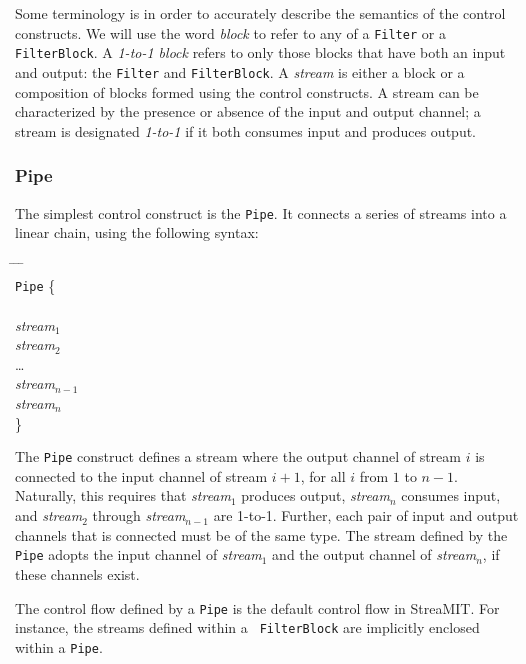 \documentclass[draft]{article}
\begin{document}
Some terminology is in order to accurately describe the semantics of
the control constructs.  We will use the word {\it block} to refer to
any of a {\tt Filter} or a {\tt FilterBlock}.
A {\it 1-to-1 block} refers to
only those blocks that have both an input and output: the {\tt Filter}
and {\tt FilterBlock}.  A {\it stream} is either a block or a
composition of blocks formed using the control constructs.  A stream
can be characterized by the presence or absence of the input and
output channel; a stream is designated {\it 1-to-1} if it both
consumes input and produces output.

\subsubsection{Pipe}

The simplest control construct is the {\tt Pipe}.  It connects a
series of streams into a linear chain, using the following syntax:

\begin{tabbing}
\hspace{0.2in} \= \hspace{0.2in} \= \hspace{0.2in} \= \hspace{0.2in} \= \\

{\tt Pipe} \{ \\ \\
\> {\it stream$_1$} \\
\> {\it stream$_2$} \\
\> \dots \\
\> {\it stream$_{n-1}$} \\
\> {\it stream$_n$} \\

\}
\end{tabbing}

The {\tt Pipe} construct defines a stream where the output channel of
stream $i$ is connected to the input channel of stream $i+1$, for all
$i$ from $1$ to $n-1$.  Naturally, this requires that {\it stream$_1$}
produces output, {\it stream$_n$} consumes input, and {\it stream$_2$}
through {\it stream$_{n-1}$} are 1-to-1.  Further, each pair of input
and output channels that is connected must be of the same type.  The
stream defined by the {\tt Pipe} adopts the input channel of {\it
stream$_1$} and the output channel of {\it stream$_n$}, if these
channels exist.

The control flow defined by a {\tt Pipe} is the default control flow
in StreaMIT.  For instance, the streams defined within a {\tt
FilterBlock} are implicitly enclosed within a {\tt Pipe}.  
\end{document}
